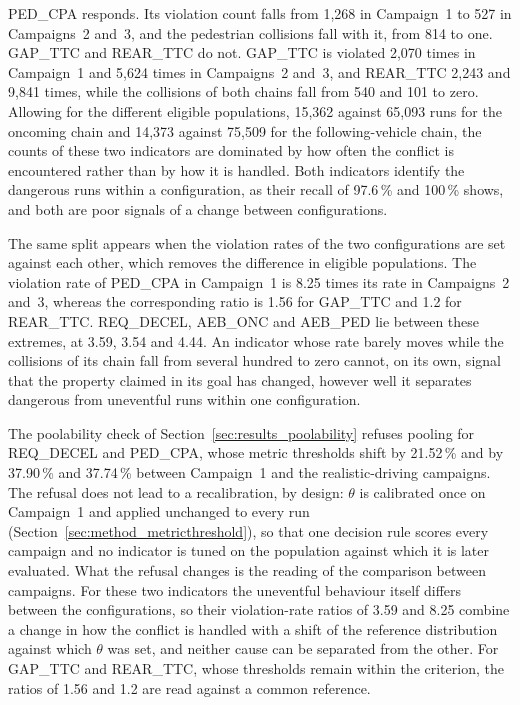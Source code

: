 PED\_CPA responds. Its violation count falls from 1,268 in Campaign~1 to 527 in
Campaigns~2 and~3, and the pedestrian collisions fall with it, from 814 to one.
GAP\_TTC and REAR\_TTC do not. GAP\_TTC is violated 2,070 times in Campaign~1 and
5,624 times in Campaigns~2 and~3, and REAR\_TTC 2,243 and 9,841 times, while the
collisions of both chains fall from 540 and 101 to zero. Allowing for the
different eligible populations, 15,362 against 65,093 runs for the oncoming chain
and 14,373 against 75,509 for the following-vehicle chain, the counts of these
two indicators are dominated by how often the conflict is encountered rather than
by how it is handled. Both indicators identify the dangerous runs within a
configuration, as their recall of 97.6\,\% and 100\,\% shows, and both are poor
signals of a change between configurations.

The same split appears when the violation rates of the two configurations are
set against each other, which removes the difference in eligible populations.
The violation rate of PED\_CPA in Campaign~1 is 8.25 times its rate in
Campaigns~2 and~3, whereas the corresponding ratio is 1.56 for GAP\_TTC and 1.2
for REAR\_TTC. REQ\_DECEL, AEB\_ONC and AEB\_PED lie between these extremes, at
3.59, 3.54 and 4.44. An indicator whose rate barely moves while the collisions of
its chain fall from several hundred to zero cannot, on its own, signal that the
property claimed in its goal has changed, however well it separates dangerous from uneventful
runs within one configuration.

The poolability check of Section~\ref{sec:results_poolability} refuses pooling for
REQ\_DECEL and PED\_CPA, whose metric thresholds shift by 21.52\,\% and by
37.90\,\% and 37.74\,\% between Campaign~1 and the realistic-driving campaigns.
The refusal does not lead to a recalibration, by design: $\theta$ is calibrated
once on Campaign~1 and applied unchanged to every run
(Section~\ref{sec:method_metricthreshold}), so that one decision rule scores every
campaign and no indicator is tuned on the population against which it is later
evaluated. What the refusal changes is the reading of the comparison between
campaigns. For these two indicators the uneventful behaviour itself differs between
the configurations, so their violation-rate ratios of 3.59 and 8.25 combine a
change in how the conflict is handled with a shift of the reference distribution
against which $\theta$ was set, and neither cause can be separated from the other.
For GAP\_TTC and REAR\_TTC, whose thresholds remain within the criterion, the
ratios of 1.56 and 1.2 are read against a common reference.


